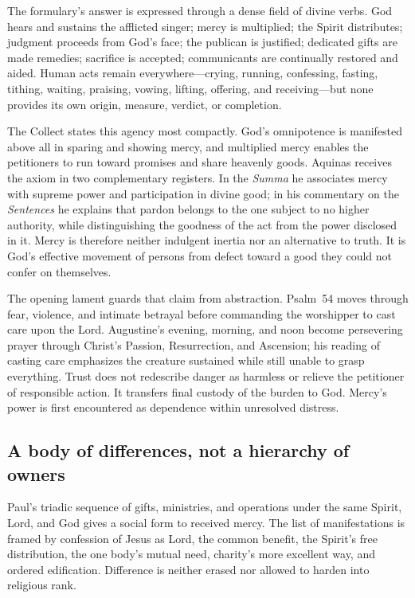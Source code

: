 The formulary's answer is expressed through a dense field of divine verbs.
God hears and sustains the afflicted singer; mercy is multiplied; the Spirit
distributes; judgment proceeds from God's face; the publican is justified;
dedicated gifts are made remedies; sacrifice is accepted; communicants are
continually restored and aided.  Human acts remain everywhere---crying,
running, confessing, fasting, tithing, waiting, praising, vowing, lifting,
offering, and receiving---but none provides its own origin, measure, verdict,
or completion.

The Collect states this agency most compactly.  God's omnipotence is manifested
above all in sparing and showing mercy, and multiplied mercy enables the
petitioners to run toward promises and share heavenly goods.  Aquinas receives
the axiom in two complementary registers.  In the \emph{Summa} he associates
mercy with supreme power and participation in divine good; in his commentary
on the \emph{Sentences} he explains that pardon belongs to the one subject to
no higher authority, while distinguishing the goodness of the act from the
power disclosed in it.  Mercy is therefore neither indulgent inertia nor an
alternative to truth.  It is God's effective movement of persons from defect
toward a good they could not confer on themselves.

The opening lament guards that claim from abstraction.  Psalm~54 moves through
fear, violence, and intimate betrayal before commanding the worshipper to
cast care upon the Lord.  Augustine's evening, morning, and noon become
persevering prayer through Christ's Passion, Resurrection, and Ascension; his
reading of casting care emphasizes the creature sustained while still unable
to grasp everything.  Trust does not redescribe danger as harmless or relieve
the petitioner of responsible action.  It transfers final custody of the
burden to God.  Mercy's power is first encountered as dependence within
unresolved distress.

\subsection*{A body of differences, not a hierarchy of owners}

Paul's triadic sequence of gifts, ministries, and operations under the same
Spirit, Lord, and God gives a social form to received mercy.  The list of
manifestations is framed by confession of Jesus as Lord, the common benefit,
the Spirit's free distribution, the one body's mutual need, charity's more
excellent way, and ordered edification.  Difference is neither erased nor
allowed to harden into religious rank.

